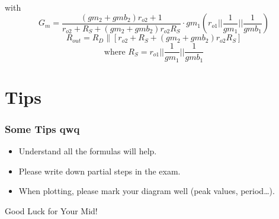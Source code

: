 \documentclass{beamer}
\begin{document}
\begin{frame}
\begin{minipage}{0.3\linewidth}
\begin{figure}[H]
        \end{figure}
    \end{minipage}\\
    with 
    \begin{equation*}
        {G}_{{m}}=\frac{({gm_2}+{gmb_2}) {r}_{{o2}}+1}{{r}_{{o2}}+{R}_{{S}}+({gm_2}+{gmb_2}) {r}_{{o2}} {R}_{{S}}}\cdot gm_1\left( r_{o1}||\dfrac{1}{gm_1}||\frac{1}{gmb_1} \right)
    \end{equation*}
    \begin{equation*}
        R_{{out }}=R_{D} \|\left[r_{o2}+R_{S}+(g m_2+g m b_2) r_{o2} R_{S}\right]
    \end{equation*}
    \begin{equation*}
        \text{where } R_S = r_{o1}||\dfrac{1}{gm_1}||\frac{1}{gmb_1}
    \end{equation*} 

\end{frame}



\section{Tips}
\begin{frame}
    \frametitle{Some Tips qwq}
    \begin{itemize}
        \item Understand all the formulas will help.
        \item Please write down partial steps in the exam.
        \item When plotting, please mark your diagram well (peak values, period\dots).
    \end{itemize}
    

\end{frame}

\begin{frame}
\Huge{\centerline{Good Luck for Your Mid!}}

\end{frame}

\end{document}
